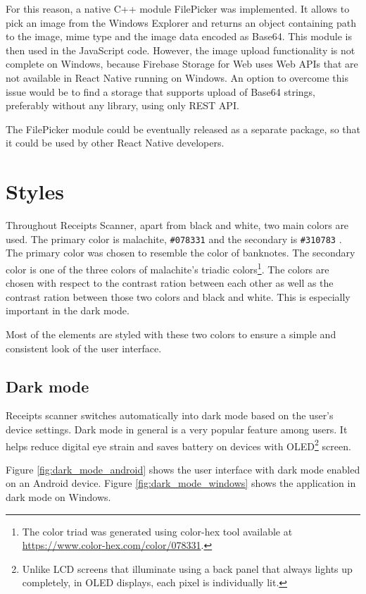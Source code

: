 \documentclass[
  digital, %
  table,   %
  oneside, %
  lof,     %
  lot,     %
]{fithesis3}
\makeatletter
\def\testclr#1#{\@testclr{#1}}
\def\@testclr#1#2{{\fboxsep\z@\fbox{\colorbox#1{#2}{\phantom{XX}}}}}
\makeatother
\begin{document}
For this reason, a native C++ module FilePicker was implemented. It allows to pick an image from the Windows Explorer and returns an object containing path to the image, mime type and the image data encoded as Base64. This module is then used in the JavaScript code. However, the image upload functionality is not complete on Windows, because Firebase Storage for Web uses Web APIs that are not available in React Native running on Windows. An option to overcome this issue would be to find a storage that supports upload of Base64 strings, preferably without any library, using only REST API.

The FilePicker module could be eventually released as a separate package, so that it could be used by other React Native developers.

\section{Styles}
Throughout Receipts Scanner, apart from black and white, two main colors are used. The primary color is malachite, \texttt{\#078331}  and the secondary is \texttt{\#310783} . The primary color was chosen to resemble the color of banknotes. The secondary color is one of the three colors of malachite's triadic colors\footnote{The color triad was generated using color-hex tool available at \url{https://www.color-hex.com/color/078331}.}. 
The colors are chosen with respect to the contrast ration between each other as well as the contrast ration between those two colors and black and white. This is especially important in the dark mode.

Most of the elements are styled with these two colors to ensure a simple and consistent look of the user interface. 

\subsection{Dark mode}
Receipts scanner switches automatically into dark mode based on the user's device settings. Dark mode in general is a very popular feature among users. It helps reduce digital eye strain and saves battery on devices with OLED\footnote{Unlike LCD screens that illuminate using a back panel that always lights up completely, in OLED displays, each pixel is individually lit.} screen.

Figure \ref{fig:dark_mode_android} shows the user interface with dark mode enabled on an Android device. Figure \ref{fig:dark_mode_windows} shows the application in dark mode on Windows.
\end{document}
